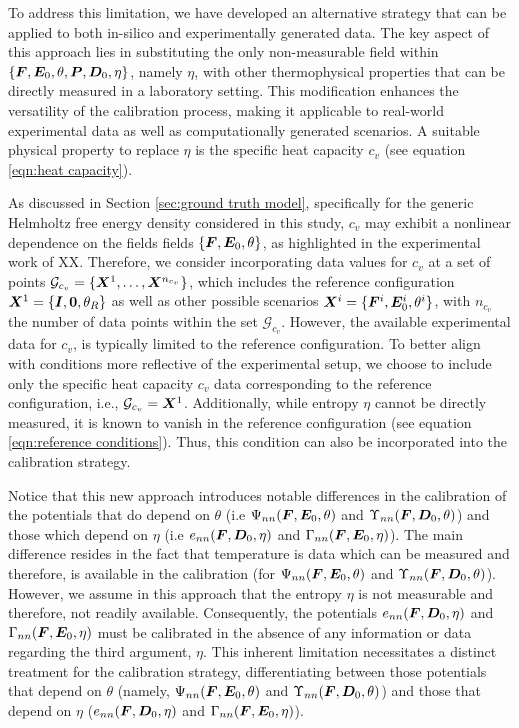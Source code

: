 To address this limitation, we have developed an alternative strategy that can be applied to both in-silico and experimentally generated data. The key aspect of this approach lies in substituting the only non-measurable field within $\{\boldsymbol{F},\boldsymbol{E}_0,\theta,\boldsymbol{P},\boldsymbol{D}_0,\eta\}$, namely $\eta$, with other thermophysical properties that can be directly measured in a laboratory setting. This modification enhances the versatility of the calibration process, making it applicable to real-world experimental data as well as computationally generated scenarios. A suitable physical property to replace $\eta$ is the specific heat capacity $c_v$ (see equation \eqref{eqn:heat capacity}). 

As discussed in Section \ref{sec:ground truth model},  specifically for the generic Helmholtz free energy density considered in this study, $c_v$ may exhibit a nonlinear dependence on the fields fields $\{\boldsymbol{F},\boldsymbol{E}_0,\theta\}$, as highlighted in the experimental work of XX. Therefore, we consider incorporating data values for $c_v$ at a set of points $\mathcal{G}_{c_v}=\{\boldsymbol{X}^1,\dots,\boldsymbol{X}^{n_{c_v}}\}$, which includes the reference configuration $\boldsymbol{X}^1=\{\boldsymbol{I},\boldsymbol{0},\theta_R\}$ as well as other possible scenarios
$\boldsymbol{X}^i=\{\boldsymbol{F}^i,\boldsymbol{E}_0^i,\theta^i\}$, with $n_{c_v}$ the number of data points within the set $\mathcal{G}_{c_v}$. However, the available experimental data for $c_v$,  is typically limited to the reference configuration. To better align with conditions more reflective of the experimental setup, we choose to include only the specific heat capacity $c_v$ data corresponding to the reference configuration, i.e., $\mathcal{G}_{c_v}=\boldsymbol{X}^1$. Additionally, while entropy $\eta$ cannot be directly measured, it is known to vanish in the reference configuration (see equation \eqref{eqn:reference conditions}).  Thus, this condition can also be incorporated into the calibration strategy.

Notice that this new approach introduces notable differences in the calibration of the potentials that do depend on $\theta$ (i.e $\Psi_{nn}(\boldsymbol{F},\boldsymbol{E}_0,\theta)$ and $\Upsilon_{nn}(\boldsymbol{F},\boldsymbol{D}_0,\theta)$) and those which depend on $\eta$ (i.e $e_{nn}(\boldsymbol{F},\boldsymbol{D}_0,\eta)$ and $\Gamma_{nn}(\boldsymbol{F},\boldsymbol{E}_0,\eta)$). The main difference resides in the fact that temperature is data which can be measured and therefore, is available in the calibration (for $\Psi_{nn}(\boldsymbol{F},\boldsymbol{E}_0,\theta)$ and $\Upsilon_{nn}(\boldsymbol{F},\boldsymbol{D}_0,\theta)$). However, we assume in this approach that the entropy $\eta$ is not measurable and therefore, not readily available. Consequently, the potentials $e_{nn}(\boldsymbol{F}, \boldsymbol{D}_0, \eta)$ and $\Gamma_{nn}(\boldsymbol{F}, \boldsymbol{E}_0, \eta)$ must be calibrated in the absence of any information or data regarding the third argument, $\eta$. This inherent limitation necessitates a distinct treatment for the calibration strategy, differentiating between those potentials that depend on $\theta$ (namely, $\Psi_{nn}(\boldsymbol{F}, \boldsymbol{E}_0, \theta)$ and $\Upsilon_{nn}(\boldsymbol{F}, \boldsymbol{D}_0, \theta)$) and those that depend on $\eta$ ($e_{nn}(\boldsymbol{F}, \boldsymbol{D}_0, \eta)$ and $\Gamma_{nn}(\boldsymbol{F}, \boldsymbol{E}_0, \eta)$).

